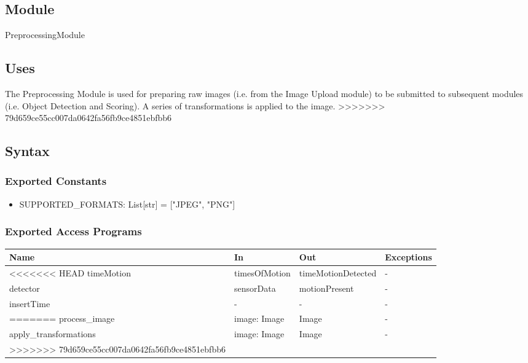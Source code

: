 \documentclass[12pt, titlepage]{article}
\begin{document}
\subsection{Module}

PreprocessingModule

\subsection{Uses}
The Preprocessing Module is used for preparing raw images (i.e. from the Image Upload module) to be submitted to subsequent modules (i.e. Object Detection and Scoring). A series of transformations is applied to the image.
>>>>>>> 79d659ce55cc007da0642fa56fb9ce4851ebfbb6

\subsection{Syntax}

\subsubsection{Exported Constants}

\begin{itemize}
  \item SUPPORTED{\_}FORMATS: List[str] = ["JPEG", "PNG"]
\end{itemize}

\subsubsection{Exported Access Programs}

\begin{center}
\begin{tabular}{p{5cm} p{3cm} p{3cm} p{2cm}}
\hline
\textbf{Name} & \textbf{In} & \textbf{Out} & \textbf{Exceptions} \\
\hline
<<<<<<< HEAD
timeMotion & timesOfMotion & timeMotionDetected & - \\
detector & sensorData & motionPresent & - \\
insertTime & - & - & - \\
=======
process{\_}image & image: Image & Image & - \\
\hline
apply{\_}transformations & image: Image & Image & - \\
>>>>>>> 79d659ce55cc007da0642fa56fb9ce4851ebfbb6
\hline
\end{tabular}
\end{center}
\end{document}
